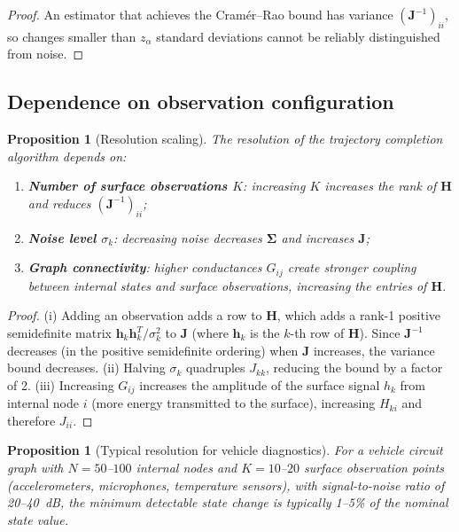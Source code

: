 \documentclass[twocolumn,10pt,a4paper]{article}
\newtheorem{proposition}[theorem]{Proposition}
\theoremstyle{definition}
\theoremstyle{remark}
\newcommand{\mat}[1]{\mathbf{#1}}
\begin{document}
\begin{proof}
An estimator that achieves the Cram\'{e}r--Rao bound has variance $(\mat{J}^{-1})_{ii}$, so changes smaller than $z_\alpha$ standard deviations cannot be reliably distinguished from noise.
\end{proof}

\subsection{Dependence on observation configuration}

\begin{proposition}[Resolution scaling]\label{prop:resolution}
The resolution of the trajectory completion algorithm depends on:
\begin{enumerate}[label=(\roman*)]
\item \textbf{Number of surface observations $K$}: increasing $K$ increases the rank of $\mat{H}$ and reduces $(\mat{J}^{-1})_{ii}$;
\item \textbf{Noise level $\sigma_k$}: decreasing noise decreases $\mat{\Sigma}$ and increases $\mat{J}$;
\item \textbf{Graph connectivity}: higher conductances $G_{ij}$ create stronger coupling between internal states and surface observations, increasing the entries of $\mat{H}$.
\end{enumerate}
\end{proposition}

\begin{proof}
(i) Adding an observation adds a row to $\mat{H}$, which adds a rank-1 positive semidefinite matrix $\mat{h}_k \mat{h}_k^T / \sigma_k^2$ to $\mat{J}$ (where $\mat{h}_k$ is the $k$-th row of $\mat{H}$). Since $\mat{J}^{-1}$ decreases (in the positive semidefinite ordering) when $\mat{J}$ increases, the variance bound decreases. (ii) Halving $\sigma_k$ quadruples $J_{kk}$, reducing the bound by a factor of 2. (iii) Increasing $G_{ij}$ increases the amplitude of the surface signal $h_k$ from internal node $i$ (more energy transmitted to the surface), increasing $H_{ki}$ and therefore $J_{ii}$.
\end{proof}

\begin{proposition}[Typical resolution for vehicle diagnostics]\label{prop:typical_resolution}
For a vehicle circuit graph with $N = 50$--$100$ internal nodes and $K = 10$--$20$ surface observation points (accelerometers, microphones, temperature sensors), with signal-to-noise ratio of 20--40~dB, the minimum detectable state change is typically 1--5\% of the nominal state value.
\end{proposition}
\end{document}
